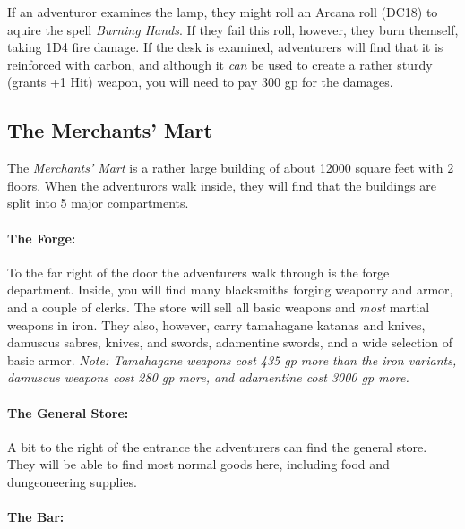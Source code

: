 \documentclass[10pt]{report}
\begin{document}
If an adventuror examines the lamp, they might roll an Arcana roll (DC18) to aquire the spell \textit{Burning Hands}. If they fail this roll, however, they burn themself, taking 1D4 fire damage. If the desk is examined, adventurers will find that it is reinforced with carbon, and although it \textit{can} be used to create a rather sturdy (grants +1 Hit) weapon, you will need to pay 300 gp for the damages.

\subsection{The Merchants' Mart}

The \textit{Merchants' Mart} is a rather large building of about 12000 square feet with 2 floors. When the adventurors walk inside, they will find that the buildings are split into 5 major compartments.

\paragraph{The Forge:}

To the far right of the door the adventurers walk through is the forge department. Inside, you will find many blacksmiths forging weaponry and armor, and a couple of clerks. The store will sell all basic weapons and \textit{most} martial weapons in iron. They also, however, carry tamahagane katanas and knives, damuscus sabres, knives, and swords, adamentine swords, and a wide selection of basic armor.
\textit{Note: Tamahagane weapons cost 435 gp more than the iron variants, damuscus weapons cost 280 gp more, and adamentine cost 3000 gp more.}

\paragraph{The General Store:}

A bit to the right of the entrance the adventurers can find the general store. They will be able to find most normal goods here, including food and dungeoneering supplies.

\paragraph{The Bar:}
\end{document}
